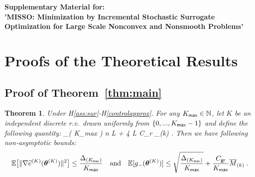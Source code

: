 \documentclass{article}
\newtheorem*{Theorem*}{Theorem}
\begin{document}




\clearpage

\appendix


\onecolumn
\centering%
{\LARGE\bf \@title Supplementary Material for: \\
'MISSO: Minimization by Incremental Stochastic Surrogate Optimization for Large Scale Nonconvex and Nonsmooth Problems'}%

\vspace{1in}

\section{Proofs of the Theoretical Results}
\subsection{Proof of Theorem~\ref{thm:main}}
\begin{Theorem*}
Under H\ref{ass:sur}-H\ref{controlapprox}. For any $K_{\sf max} \in \NN$, let $K$ be an independent discrete r.v.~drawn uniformly from $\{0,...,K_{\sf max}-1\}$ and define the following quantity:
\beq\notag
\Delta_{( K_{\sf max} )}  n L  +  4 L C_{\sf r} _{(k)} \eqsp.
\eeq
Then we have following non-asymptotic bounds:
\begin{align} \notag
 \EE \big[ \| \grd \eSur{K}{\hp{K}} \|^2 \big]  \leq \frac{\Delta_{( K_{\sf max} )}}{K_{\sf max}} \quad \textrm{and} \quad \EE[ g_-( \hp{K} ) ]  \leq \sqrt{\frac{ \Delta_{( K_{\sf max} )} }{ K_{\sf max} }} + \frac{C_{\sf gr}}{K_{\sf max}}  \overline{M}_{(k)} \eqsp.
\end{align}
\end{Theorem*}
\end{document}
